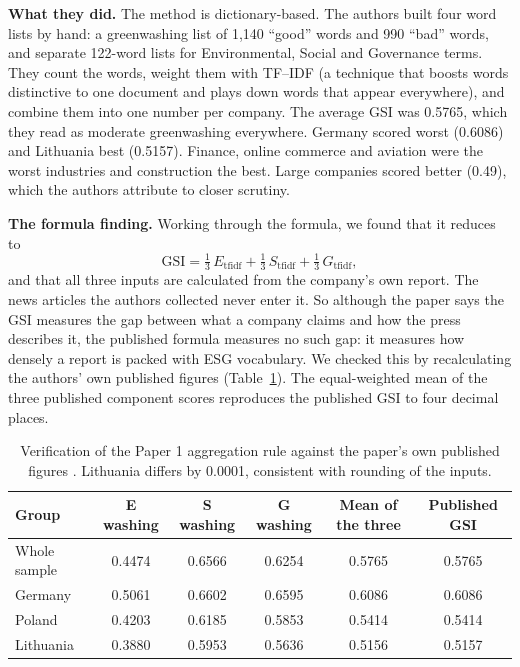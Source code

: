 \documentclass[12pt,a4paper]{article}
\newcommand{\lab}[1]{\textbf{#1}}
\begin{document}
\lab{What they did.} The method is dictionary-based. The authors built four word lists by hand: a
greenwashing list of 1,140 ``good'' words and 990 ``bad'' words, and separate 122-word lists for
Environmental, Social and Governance terms. They count the words, weight them with TF--IDF (a
technique that boosts words distinctive to one document and plays down words that appear
everywhere), and combine them into one number per company. The average GSI was 0.5765, which they
read as moderate greenwashing everywhere. Germany scored worst (0.6086) and Lithuania best
(0.5157). Finance, online commerce and aviation were the worst industries and construction the
best. Large companies scored better (0.49), which the authors attribute to closer scrutiny.

\lab{The formula finding.} Working through the formula, we found that it reduces to
\begin{equation}
\mathrm{GSI} = \tfrac13\,E_{\mathrm{tfidf}} + \tfrac13\,S_{\mathrm{tfidf}} + \tfrac13\,G_{\mathrm{tfidf}},
\end{equation}
and that all three inputs are calculated from the company's own report. The news articles the
authors collected never enter it. So although the paper says the GSI measures the gap between
what a company claims and how the press describes it, the published formula measures no such
gap: it measures how densely a report is packed with ESG vocabulary. We checked this by
recalculating the authors' own published figures (Table~\ref{tab:gsiverify}). The equal-weighted
mean of the three published component scores reproduces the published GSI to four decimal places.

\begin{table}[!htbp]
\centering
\caption{Verification of the Paper 1 aggregation rule against the paper's own published figures
\citep{davidescu2026}. Lithuania differs by 0.0001, consistent with rounding of the inputs.}
\label{tab:gsiverify}
\small
\begin{tabular}{@{}lccccc@{}}
\toprule
Group & E washing & S washing & G washing & Mean of the three & Published GSI \\
\midrule
Whole sample & 0.4474 & 0.6566 & 0.6254 & 0.5765 & 0.5765 \\
Germany      & 0.5061 & 0.6602 & 0.6595 & 0.6086 & 0.6086 \\
Poland       & 0.4203 & 0.6185 & 0.5853 & 0.5414 & 0.5414 \\
Lithuania    & 0.3880 & 0.5953 & 0.5636 & 0.5156 & 0.5157 \\
\bottomrule
\end{tabular}
\end{table}
\end{document}
